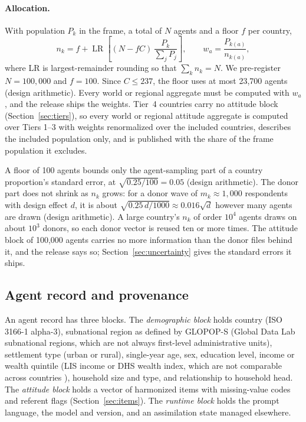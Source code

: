 \documentclass[10pt]{article}
\begin{document}
\paragraph{Allocation.} With population $P_k$ in the frame, a total of $N$ agents and a floor $f$ per country,
\begin{equation}
n_k = f + \operatorname{LR}\!\left[(N - fC)\,\frac{P_k}{\sum_j P_j}\right],\qquad w_a = \frac{P_{k(a)}}{n_{k(a)}},
\end{equation}
where LR is largest-remainder rounding so that $\sum_k n_k = N$. We pre-register $N = 100{,}000$ and $f = 100$. Since $C \le 237$, the floor uses at most 23,700 agents (design arithmetic). Every world or regional aggregate must be computed with $w_a$, and the release ships the weights. Tier~4 countries carry no attitude block (Section~\ref{sec:tiers}), so every world or regional attitude aggregate is computed over Tiers 1--3 with weights renormalized over the included countries, describes the included population only, and is published with the share of the frame population it excludes.

A floor of 100 agents bounds only the agent-sampling part of a country proportion's standard error, at $\sqrt{0.25/100} = 0.05$ (design arithmetic). The donor part does not shrink as $n_k$ grows: for a donor wave of $m_k \approx 1{,}000$ respondents with design effect $d$, it is about $\sqrt{0.25\,d/1000} \approx 0.016\sqrt{d}$ however many agents are drawn (design arithmetic). A large country's $n_k$ of order $10^4$ agents draws on about $10^3$ donors, so each donor vector is reused ten or more times. The attitude block of 100,000 agents carries no more information than the donor files behind it, and the release says so; Section~\ref{sec:uncertainty} gives the standard errors it ships.

\subsection{Agent record and provenance}
\label{sec:schema}

An agent record has three blocks. The \emph{demographic block} holds country (ISO 3166-1 alpha-3), subnational region as defined by GLOPOP-S (Global Data Lab subnational regions, which are not always first-level administrative units), settlement type (urban or rural), single-year age, sex, education level, income or wealth quintile (LIS income or DHS wealth index, which are not comparable across countries \citep{ton2024glopop}), household size and type, and relationship to household head. The \emph{attitude block} holds a vector of harmonized items with missing-value codes and referent flags (Section~\ref{sec:items}). The \emph{runtime block} holds the prompt language, the model and version, and an assimilation state managed elsewhere.
\end{document}
